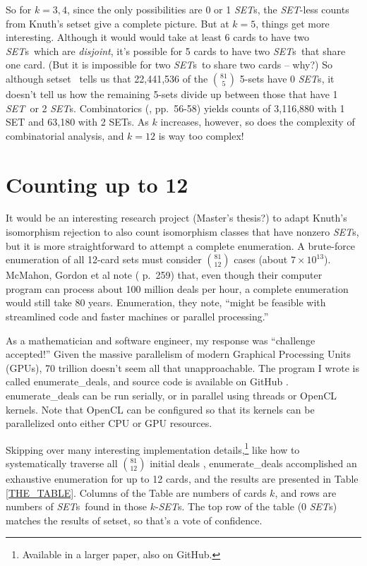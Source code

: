 \documentclass{article}
\newcommand{\SET}{{\em SET}}
\newcommand{\SETs}{{\em SET}s}
\newcommand{\SETSET}{{\sc setset}}
\newcommand{\SETSETb}{{\sc setset }}
\newcommand{\ED}{{\sc enumerate\_deals}}
\newcommand{\EDb}{{\sc enumerate\_deals }}
\begin{document}
So for $k=3,4$, since the only possibilities are 0 or 1 \SETs, the \SET-less
counts from Knuth's \SETSETb give a complete picture. But at $k=5$, things get
more interesting. Although it would would take at least 6 cards to have two
\SETs~which are {\em disjoint}, it's possible for 5 cards to have two \SETs~that
share one card. (But it is impossible for two \SETs~to share two cards -- why?)
So although \SETSETb~tells us that 22,441,536 of the $\binom{81}{5}$ 5-sets have
0 \SETs, it doesn't tell us how the remaining 5-sets divide up between those
that have 1 \SET~or 2 \SETs. Combinatorics (\cite{JOS}, pp.~56-58) yields counts
of 3,116,880 with 1 SET and 63,180 with 2 SETs. As $k$ increases, however, so
does the complexity of combinatorial analysis, and $k=12$ is way too complex!

\section{Counting up to 12}
It would be an interesting research project (Master's thesis?) to adapt Knuth's
isomorphism rejection to also count isomorphism classes that have nonzero \SETs,
but it is more straightforward to attempt a complete enumeration. A brute-force
enumeration of all 12-card sets must consider $\binom{81}{12}$ cases (about
$7\times 10^{13}$). McMahon, Gordon et al note (\cite{JOS} p.~259) that, even
though their computer program can process about 100 million deals per hour, a
complete enumeration would still take 80 years. Enumeration, they note, ``might
be feasible with streamlined code and faster machines or parallel processing.''

As a mathematician and software engineer, my response was ``challenge
accepted!'' Given the massive parallelism of modern Graphical Processing Units
(GPUs), 70 trillion doesn't seem all that unapproachable. The program I wrote is
called \ED, and source code is available on GitHub \cite{ME}. \EDb can be run
serially, or in parallel using threads or OpenCL \cite{OPENCL} kernels. Note
that OpenCL can be configured so that its kernels can be parallelized onto
either CPU or GPU resources.

Skipping over many interesting implementation details,\footnote{Available in a
larger paper, also on GitHub.} like how to systematically traverse all
$\binom{81}{12}$ initial deals \cite{WIKI}, \EDb accomplished an exhaustive
enumeration for up to 12 cards, and the results are presented in Table
\ref{THE_TABLE}. Columns of the Table are numbers of cards $k$, and rows are
numbers of \SETs~found in those $k$-\SETs.  The top row of the table (0 \SETs)
matches the results of \SETSET, so that's a vote of confidence.
\end{document}

